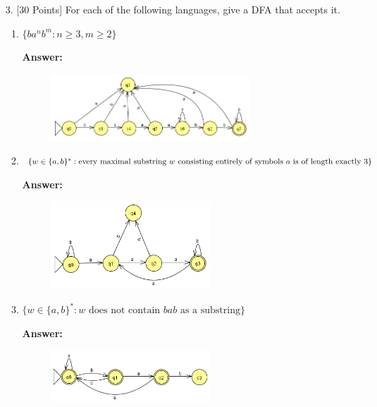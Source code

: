 \documentclass[12pt]{article}
\begin{document}
\begin{enumerate}
\begin{enumerate}
	      \end{enumerate}

	      \newpage

	\item[3.] [30 Points] For each of the following languages, give a DFA that accepts it.

	      \begin{enumerate}
		      \item $\{ba^nb^m : n \geq 3, m \geq 2 \}$

		            \noindent \textbf{Answer:}

		            \begin{figure}[h!]
			            \centering
			            \includegraphics[width=0.75\textwidth]{img/q3/q3_a.png}
		            \end{figure}

		      \item $\{w \in \{a,b \}^* : \text{every maximal substring } w \text{ consisting entirely of symbols } a \\ \text{ is of length exactly 3} \}$

		            \noindent \textbf{Answer:}

		            \begin{figure}[h!]
			            \centering
			            \includegraphics[width=0.6\textwidth]{img/q3/q3_b.png}
		            \end{figure}

		      \item $\{w \in \{a,b \}^* : \text{$w$ does not contain $bab$ as a substring} \}$

		            \noindent \textbf{Answer:}

		            \begin{figure}[h!]
			            \centering
			            \includegraphics[width=0.6\textwidth]{img/q3/q3_c.png}
		            \end{figure}


\end{enumerate}
\end{enumerate}
\end{document}
